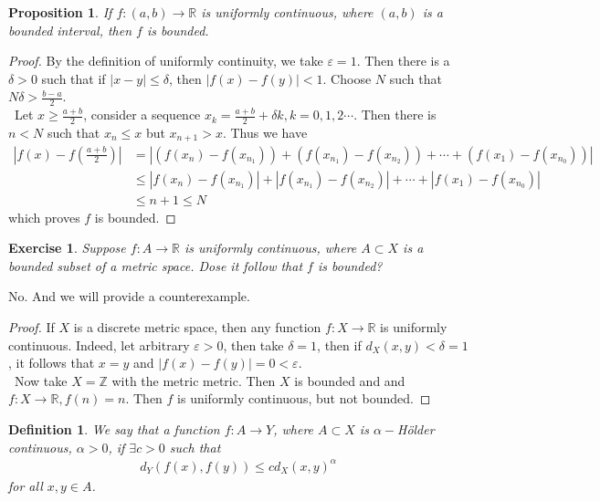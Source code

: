 \documentclass[12pt,leqno]{amsart}
\newtheorem{definition}{Definition}[section]
\newtheorem{proposition}{Proposition}[section]
\newtheorem{exercise}{Exercise}[section]
\theoremstyle{definition}
\numberwithin{equation}{subsection}
\begin{document}
\medskip

\begin{proposition}
If $f:(a,b)\to \mathbb{R}$ is uniformly continuous, where $(a,b)$ is a bounded interval, then $f$ is bounded.
\end{proposition}
\begin{proof}
By the definition of uniformly continuity, we take $\varepsilon = 1$. Then there is a $\delta > 0$ such that if $|x-y|\leq\delta$, then $|f(x)-f(y)| < 1$. Choose $N$ such that $N\delta > \frac{b-a}{2}$. \\
\hspace*{1em}\, Let $x\geq \frac{a+b}{2}$, consider a sequence $x_k = \frac{a+b}{2}+\delta k, k=0,1,2\cdots$. Then there is $n<N$ such that $x_n \leq x$ but $x_{n+1}>x$. Thus we have 
\begin{align*}
    \left|f(x) - f\left(\frac{a+b}{2}\right)\right| & = \left|(f(x_n)-f(x_{n_1})) + (f(x_{n_1})-f(x_{n_2})) + \cdots + (f(x_1)-f(x_{n_0}))\right| \\
    & \leq \left|f(x_n)-f(x_{n_1})\right|  + \left|f(x_{n_1})-f(x_{n_2})\right| + \cdots + \left|f(x_1)-f(x_{n_0})\right| \\
    & \leq n+1 \leq N
\end{align*}
which proves $f$ is bounded. 
\end{proof}

\begin{exercise}
Suppose $f:A\to \mathbb{R}$ is uniformly continuous, where $A\subset X$ is a bounded subset of a metric space. Dose it follow that $f$ is bounded? 
\end{exercise}

No. And we will provide a counterexample. 

\begin{proof}
If $X$ is a discrete metric space, then any function $f:X\to\mathbb{R}$ is uniformly continuous. Indeed, let arbitrary $\varepsilon > 0$, then take $\delta = 1$, then if $d_X(x,y)< \delta = 1$, it follows that $x = y$ and $|f(x)-f(y)| = 0 < \varepsilon$. \\
\hspace*{1em}\, Now take $X = \mathbb{Z}$ with the metric metric. Then $X$ is bounded and and $f:X\to \mathbb{R}, f(n) = n$. Then $f$ is uniformly continuous, but not bounded.
\end{proof}

\medskip

\begin{definition}
We say that a function $f:A\to Y$, where $A\subset X$ is $\alpha-$Hölder continuous, $\alpha > 0$, if $\exists c > 0$ such that
\begin{align*}
    d_Y(f(x),f(y))\leq c d_X(x,y)^\alpha
\end{align*}
for all $x,y\in A$.
\end{definition}
\end{document}
